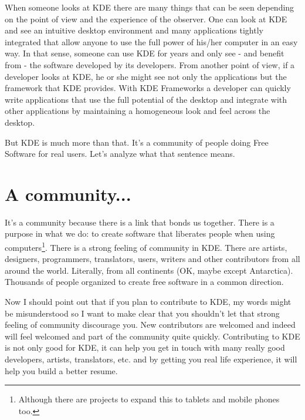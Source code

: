 
\noindent{}When someone looks at KDE there are many things that can be seen depending on the point of view and the experience of the observer. One can look at KDE and see an intuitive desktop environment and many applications tightly integrated that allow anyone to use the full power of his/her computer in an easy way. In that sense, someone can use KDE for years and only see - and benefit from - the software developed by its developers. From another point of view, if a developer looks at KDE, he or she might see not only the applications but the framework that KDE provides. With KDE Frameworks a developer can quickly write applications that use the full potential of the desktop and integrate with other applications by maintaining a homogeneous look and feel across the desktop. 

But KDE is much more than that. It's a community of people doing Free Software for real users. Let's analyze what that sentence means.

\section*{A community...}
It's a community because there is a link that bonds us together. There is a purpose in what we do: to create software that liberates people when using computers\footnote{Although there are projects to expand this to tablets and mobile phones too.}. There is a strong feeling of community in KDE. There are artists, designers, programmers, translators, users, writers and other contributors from all around the world. Literally, from all continents (OK, maybe except Antarctica). Thousands of people organized to create free software in a common direction.

Now I should point out that if you plan to contribute to KDE, my words might be misunderstood so I want to make clear that you shouldn't let that strong feeling of community discourage you. New contributors are welcomed and indeed will feel welcomed and part of the community quite quickly. Contributing to KDE is not only good for KDE, it can help you get in touch with many really good developers, artists, translators, etc. and by getting you real life experience, it will help you build a better resume.

